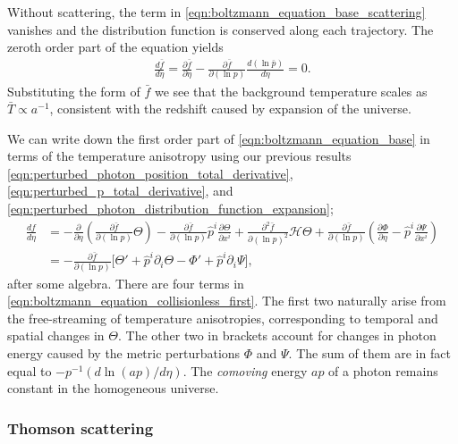 Without scattering, the term in \eqref{eqn:boltzmann_equation_base_scattering} vanishes and the distribution function is conserved along each trajectory. The zeroth order part of the equation yields
\begin{align}
	\frac{d\bar{f}}{d\eta} = \frac{\partial \bar{f}}{\partial\eta} - \frac{\partial \bar{f}}{\partial(\ln p)}\frac{d(\ln\bar{p})}{d\eta} = 0. \label{eqn:boltzmann_equation_collisionless_zeroth}
\end{align}
Substituting the form of $\bar{f}$ we see that the background temperature scales as $\bar{T}\propto a^{-1}$, consistent with the redshift caused by expansion of the universe.

We can write down the first order part of \eqref{eqn:boltzmann_equation_base} in terms of the temperature anisotropy using our previous results \eqref{eqn:perturbed_photon_position_total_derivative}, \eqref{eqn:perturbed_p_total_derivative}, and \eqref{eqn:perturbed_photon_distribution_function_expansion};
\begin{align}
	\frac{df}{d\eta} &= - \frac{\partial}{\partial\eta} \left( \frac{\partial \bar{f}}{\partial(\ln p)} \Theta \right) - \frac{\partial \bar{f}}{\partial (\ln p)} \hat{p}^i \frac{\partial \Theta}{\partial x^i} +  \frac{\partial^2 \bar{f}}{\partial(\ln p)^2} \mathcal{H}\Theta + \frac{\partial \bar{f}}{\partial (\ln p)} \left( \frac{\partial \Phi}{\partial \eta} - \hat{p}^i \frac{\partial \Psi}{\partial x^i} \right) \\
	&= - \frac{\partial \bar{f}}{\partial (\ln p)} \biggl[ \Theta' + \hat{p}^i \partial_i \Theta - \Phi' + \hat{p}^i \partial_i \Psi \biggr], \label{eqn:boltzmann_equation_collisionless_first}
\end{align}
after some algebra. There are four terms in \eqref{eqn:boltzmann_equation_collisionless_first}. The first two naturally arise from the free-streaming of temperature anisotropies, corresponding to temporal and spatial changes in $\Theta$. The other two in brackets account for changes in photon energy caused by the metric perturbations $\Phi$ and $\Psi$. The sum of them are in fact equal to $-p^{-1}(d \ln(ap)/d\eta)$. The \textit{comoving} energy $ap$ of a photon remains constant in the homogeneous universe.


\subsubsection*{Thomson scattering} \label{section:thompson_scattering}



